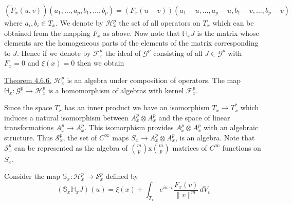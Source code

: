 \[
(\widetilde F_x(u,v))(a_1,\ldots,a_p,b_1,\ldots,b_p)=(F_x(u-v))(a_1-u,\ldots,a_p-u,b_1-v,\ldots,b_p-v)
\]
where $a_i,b_i\in T_x$. We denote by $\mathcal H_x^p$ the set of all operators on $T_x$ which can be obtained from the mapping $F_x$ as above. Now note that $\mathbb H_xJ$ is the matrix whose elements are the homogeneous parts of the elements of the matrix corresponding to $J$. Hence if we denote by $\mathcal F_x^p$ the ideal of $\mathcal G^p$ consisting of all $J\in\mathcal G^p$ with $F_x=0$ and $\xi(x)=0$ then we obtain

\uline{Theorem 4.6.6.} $\mathcal H_x^p$ is an algebra under composition of operators. The map $\mathbb H_x:\mathcal G^p\longrightarrow\mathcal H_x^p$ is a homomorphism of algebras with kernel $\mathcal F_x^p$.

Since the space $T_x$ has an inner product we have an isomorphism $T_x\longrightarrow T_x^*$ which induces a natural isomorphism between $A_x^p\otimes A_x^p$ and the space of linear transformations $A_x^p\longrightarrow A_x^p$. This isomorphism provides $A_x^p\otimes A_x^p$ with an algebraic structure. Thus $\mathcal S_x^p$, the set of $C^\infty$ maps $S_x\longrightarrow A_x^p\otimes A_x^p$, is an algebra. Note that $\mathcal S_x^p$ can be represented as the algebra of $\binom{m}{p}\mathbin{\mathrm x}\binom{m}{p}$ matrices of $C^\infty$ functions on $S_x$.

Consider the map $\mathbb S_x:\mathcal H_x^p\longrightarrow\mathcal S_x^p$ defined by
\[
\tag{4.6.7}
(\mathbb S_x\mathbb H_xJ)(u)=\xi(x)+\int_{T_x}e^{iu\cdot v}\frac{F_x(v)}{\lVert v\rVert^m}\,dV_v
\]
